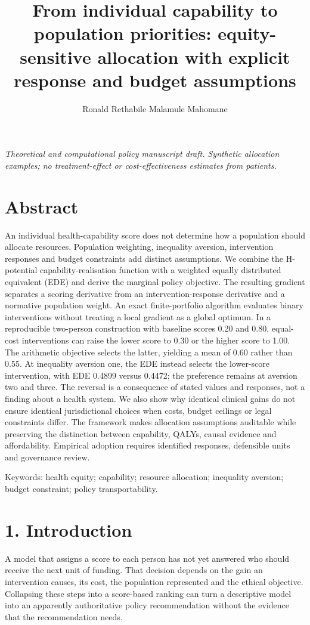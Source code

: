 \documentclass[11pt,a4paper]{article}
\title{From individual capability to population priorities: equity-sensitive allocation with explicit response and budget assumptions}
\author{Ronald Rethabile Malamule Mahomane}
\date{}
\begin{document}
\maketitle
\begin{center}\small\itshape Theoretical and computational policy manuscript draft. Synthetic allocation examples; no treatment-effect or cost-effectiveness estimates from patients.\end{center}

\section*{Abstract}
An individual health-capability score does not determine how a population should allocate resources. Population weighting, inequality aversion, intervention responses and budget constraints add distinct assumptions. We combine the H-potential capability-realisation function with a weighted equally distributed equivalent (EDE) and derive the marginal policy objective. The resulting gradient separates a scoring derivative from an intervention-response derivative and a normative population weight. An exact finite-portfolio algorithm evaluates binary interventions without treating a local gradient as a global optimum. In a reproducible two-person construction with baseline scores 0.20 and 0.80, equal-cost interventions can raise the lower score to 0.30 or the higher score to 1.00. The arithmetic objective selects the latter, yielding a mean of 0.60 rather than 0.55. At inequality aversion one, the EDE instead selects the lower-score intervention, with EDE 0.4899 versus 0.4472; the preference remains at aversion two and three. The reversal is a consequence of stated values and responses, not a finding about a health system. We also show why identical clinical gains do not ensure identical jurisdictional choices when costs, budget ceilings or legal constraints differ. The framework makes allocation assumptions auditable while preserving the distinction between capability, QALYs, causal evidence and affordability. Empirical adoption requires identified responses, defensible units and governance review.

Keywords: health equity; capability; resource allocation; inequality aversion; budget constraint; policy transportability.

\section*{1. Introduction}
A model that assigns a score to each person has not yet answered who should receive the next unit of funding. That decision depends on the gain an intervention causes, its cost, the population represented and the ethical objective. Collapsing these steps into a score-based ranking can turn a descriptive model into an apparently authoritative policy recommendation without the evidence that the recommendation needs.
\end{document}

